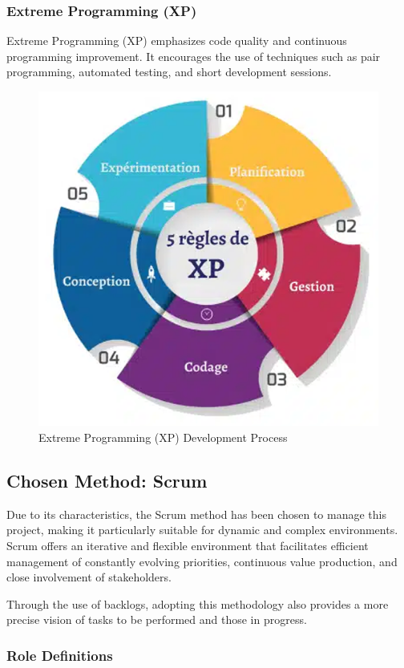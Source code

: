 \subsubsection{Extreme Programming (XP)}

Extreme Programming (XP) emphasizes code quality and continuous programming improvement. It encourages the use of techniques such as pair programming, automated testing, and short development sessions.

\begin{figure}[H]
    \centering
    \includegraphics[width=0.6\columnwidth]{img/architecture/Extreme Programming.png}
    \caption{Extreme Programming (XP) Development Process}
    \label{fig:xp_process}
\end{figure}

\subsection{Chosen Method: Scrum}

Due to its characteristics, the Scrum method has been chosen to manage this project, making it particularly suitable for dynamic and complex environments. Scrum offers an iterative and flexible environment that facilitates efficient management of constantly evolving priorities, continuous value production, and close involvement of stakeholders.

Through the use of backlogs, adopting this methodology also provides a more precise vision of tasks to be performed and those in progress.

\subsubsection{Role Definitions}

